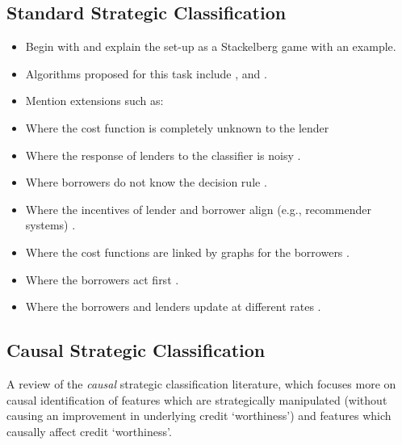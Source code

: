 \subsection{Standard Strategic Classification}


\begin{itemize}
	\item Begin with \textcite{hardtStrategicClassification2016} and explain the set-up as a Stackelberg game with an example.
	
	\item Algorithms proposed for this task include  \textcite{levanonStrategicClassificationMade2021}, \textcite{chenLearningStrategyAwareLinear2020} and \textcite{ahmadiClassificationStrategicAgents2022}. 
	
	\item Mention extensions such as:
	
	\item Where the cost function is completely unknown to the lender \citep{dongStrategicClassificationRevealed2018}
	
	\item Where the response of lenders to the classifier is noisy \citep{jagadeesanAlternativeMicrofoundationsStrategic2021}.
	
	\item Where borrowers do not know the decision rule \citep{ghalmeStrategicClassificationDark2021, bechavodInformationDiscrepancyStrategic2022}.
	
	\item Where the incentives of lender and borrower align (e.g., recommender systems) \citep{levanonGeneralizedStrategicClassification2022}.
	
	\item Where the cost functions are linked by graphs for the borrowers \citep{eilatStrategicClassificationGraph2023}.
	
	\item Where the borrowers act first \citep{nairStrategicRepresentation2022}.
	
	\item Where the borrowers and lenders update at different rates \citep{zrnicWhoLeadsWho2021}.
\end{itemize}

\subsection{Causal Strategic Classification}
A review of the \textit{causal} strategic classification literature, which focuses more on causal identification of features which are strategically manipulated (without causing an improvement in underlying credit `worthiness') and features which causally affect credit `worthiness'.



